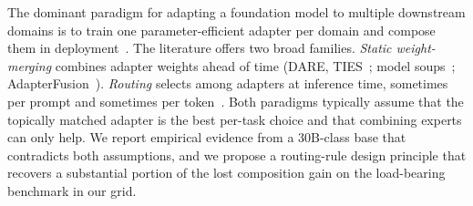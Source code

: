 \documentclass{article}
\begin{document}
The dominant paradigm for adapting a foundation model to multiple downstream domains is to train one parameter-efficient adapter per domain and compose them in deployment~\cite{hu2021lora}. The literature offers two broad families. \emph{Static weight-merging} combines adapter weights ahead of time (DARE, TIES~\cite{edalati2023absorbing,quarantiello2024adaptive}; model soups~\cite{wortsman2022model}; AdapterFusion~\cite{pfeiffer2020adapterfusion}). \emph{Routing} selects among adapters at inference time, sometimes per prompt and sometimes per token~\cite{pfeiffer2020adapterfusion,shazeer2017moe,fedus2021switch}. Both paradigms typically assume that the topically matched adapter is the best per-task choice and that combining experts can only help. We report empirical evidence from a 30B-class base that contradicts both assumptions, and we propose a routing-rule design principle that recovers a substantial portion of the lost composition gain on the load-bearing benchmark in our grid.
\end{document}
